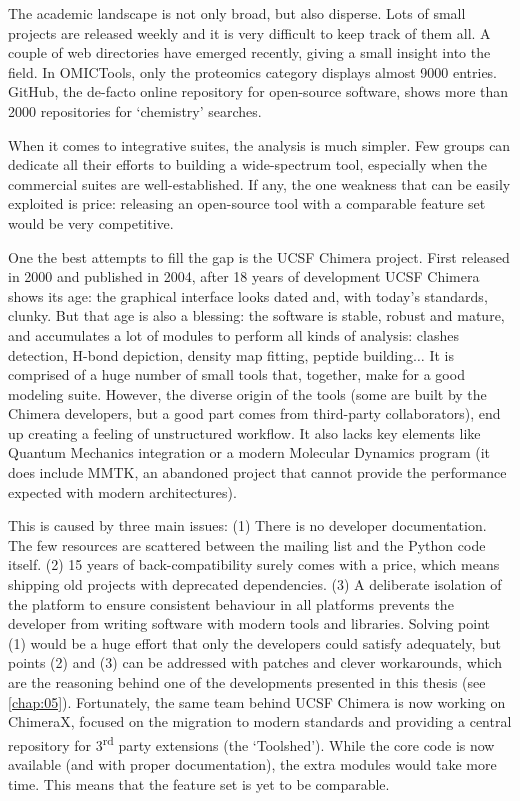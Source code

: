 The academic landscape is not only broad, but also disperse. Lots of small projects are released weekly and it is very difficult to keep track of them all. A couple of web directories have emerged recently,\cite{omictools,pirhadi2016open} giving a small insight into the field. In OMICTools, only the proteomics category displays almost 9000 entries. GitHub,\cite{github} the de-facto online repository for open-source software, shows more than 2000 repositories for ‘chemistry’ searches.

When it comes to integrative suites, the analysis is much simpler. Few groups can dedicate all their efforts to building a wide-spectrum tool, especially when the commercial suites are well-established. If any, the one weakness that can be easily exploited is price: releasing an open-source tool with a comparable feature set would be very competitive.

One the best attempts to fill the gap is the UCSF Chimera project. First released in 2000\cite{firstchimera} and published in 2004,\cite{chimera} after 18 years of development UCSF Chimera shows its age: the graphical interface looks dated and, with today’s standards, clunky. But that age is also a blessing: the software is stable, robust and mature, and accumulates a lot of modules to perform all kinds of analysis: clashes detection, H-bond depiction, density map fitting, peptide building$ \ldots $  It is comprised of a huge number of small tools that, together, make for a good modeling suite. However, the diverse origin of the tools (some are built by the Chimera developers, but a good part comes from third-party collaborators), end up creating a feeling of unstructured workflow. It also lacks key elements like Quantum Mechanics integration or a modern Molecular Dynamics program (it does include MMTK, an abandoned project that cannot provide the performance expected with modern architectures).

This is caused by three main issues: (1) There is no developer documentation. The few resources are scattered between the mailing list and the Python code itself. (2) 15 years of back-compatibility surely comes with a price, which means shipping old projects with deprecated dependencies. (3) A deliberate isolation of the platform to ensure consistent behaviour in all platforms prevents the developer from writing software with modern tools and libraries. Solving point (1) would be a huge effort that only the developers could satisfy adequately, but points (2) and (3) can be addressed with patches and clever workarounds, which are the reasoning behind one of the developments presented in this thesis (see \autoref{chap:05}). Fortunately, the same team behind UCSF Chimera is now working on ChimeraX, focused on the migration to modern standards and providing a central repository for 3\textsuperscript{rd} party extensions (the ‘Toolshed’). While the core code is now available (and with proper documentation), the extra modules would take more time. This means that the feature set is yet to be comparable.

